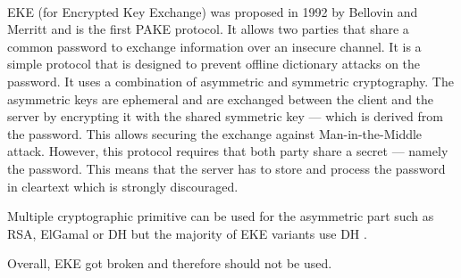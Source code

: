 \documentclass[../report.tex]{subfiles}
\begin{document}
\paragraph{}

EKE (for Encrypted Key Exchange) was proposed in 1992 by Bellovin and Merritt \cite{EKE_Paper} and is the first PAKE protocol. 
It allows two parties that share a common password to exchange information over an insecure channel.
It is a simple protocol that is designed to prevent offline dictionary attacks on the password.
It uses a combination of asymmetric and symmetric cryptography.
The asymmetric keys are ephemeral and are exchanged between the client and the server by encrypting it with the shared symmetric key --- which is derived from the password.
This allows securing the exchange against Man-in-the-Middle attack. %
However, this protocol requires that both party share a secret --- namely the password. This means that the server has to store and process the password in cleartext which is strongly discouraged. %


Multiple cryptographic primitive can be used for the asymmetric part such as RSA, ElGamal or DH but the majority of EKE variants use DH \cite{Breaking_EKE}. %

Overall, EKE got broken and therefore should not be used. %






\paragraph{}
\end{document}
